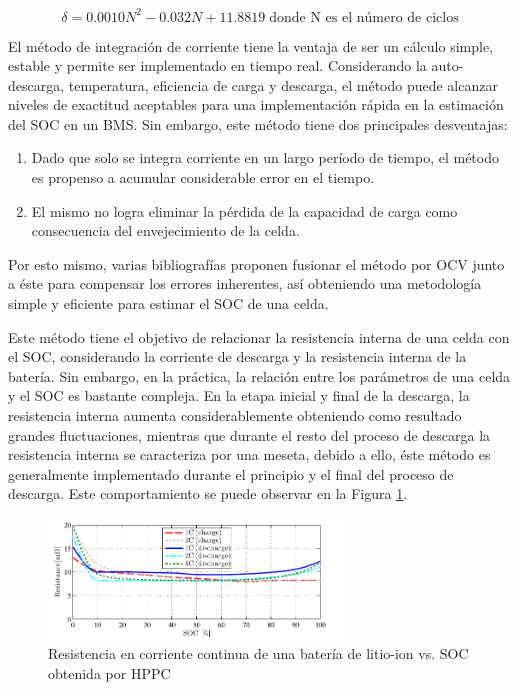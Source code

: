 \documentclass[10pt,a4paper]{article}
\newcounter{subsubsubsection}[subsubsection]
\begin{document}
\begin{equation}
    \delta = 0.0010N^2 - 0.032N + 11.8819\label{batt_cap_correction}\;
    \text{donde N es el n\'umero de ciclos}
\end{equation}

\noindent El m\'etodo de integraci\'on de corriente tiene la ventaja de ser un
c\'alculo simple, estable y permite ser implementado en tiempo real.
Considerando la auto-descarga, temperatura, eficiencia de carga y descarga, el
m\'etodo puede alcanzar niveles de exactitud aceptables para una
implementaci\'on r\'apida en la estimaci\'on del \acrshort{SOC} en un BMS. Sin
embargo, este m\'etodo tiene dos principales desventajas:

\begin{enumerate}
    \item Dado que solo se integra corriente en un largo per\'iodo de tiempo, el
        m\'etodo es propenso a acumular considerable error en el tiempo.
    \item El mismo no logra eliminar la p\'erdida de la capacidad de carga como
        consecuencia del envejecimiento de la celda.
\end{enumerate}

\noindent Por esto mismo, varias bibliograf\'ias proponen fusionar el m\'etodo
por \acrshort{OCV} junto a \'este para compensar los errores inherentes, as\'i
obteniendo una metodolog\'ia simple y eficiente para estimar el \acrshort{SOC}
de una celda.

\label{internalRMethod}

\noindent Este m\'etodo tiene el objetivo de relacionar la resistencia interna
de una celda con el \acrshort{SOC}, considerando la corriente de descarga y la
resistencia interna de la bater\'ia. Sin embargo, en la pr\'actica, la
relaci\'on entre los par\'ametros de una celda y el \acrshort{SOC} es bastante
compleja. En la etapa inicial y final de la descarga, la resistencia interna
aumenta considerablemente obteniendo como resultado grandes fluctuaciones,
mientras que durante el resto del proceso de descarga la resistencia interna se
caracteriza por una meseta, debido a ello, \'este m\'etodo es generalmente
implementado durante el principio y el final del proceso de descarga. Este 
comportamiento se puede observar en la Figura \ref{res_int_graph}.

\begin{figure}[h]
    \begin{center}
	\includegraphics[width=0.7\textwidth]{Ro_vs_SOC.png}
	\caption{Resistencia en corriente continua de una batería de litio-ion vs. 
        SOC obtenida por HPPC}
	\label{res_int_graph}
    \end{center}
\end{figure}
\end{document}
